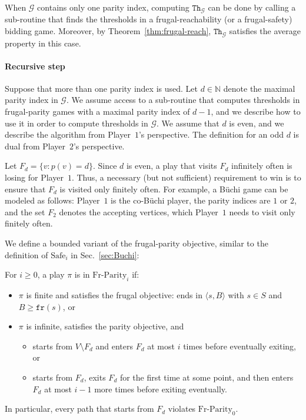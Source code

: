 \documentclass{article}\providecommand{\nequiv}{\not\equiv}\usepackage[a4paper,margin=20mm]{geometry}
\newcommand{\PO}{Player~$1$\xspace}
\newcommand{\PT}{Player~$2$\xspace}
\newcommand{\G}{{\mathcal G}}
\newcommand{\fr}{\texttt{fr}}
\newcommand{\Nat}{\mathbb{N}}
\newcommand{\notFd}{V \setminus F_d}
\newcommand{\thresh}{\texttt{Th}\xspace}
\newcommand{\safe}{\text{Safe}}
\newcommand{\frparity}{\text{Fr-Parity}}
\newcommand{\zug}[1]{\langle #1  \rangle}
\renewcommand{\set}[1]{\{ #1  \}}
\begin{document}
\begin{corollary}
When $\G$ contains only one parity index, computing $\thresh_\G$ can be done by calling a sub-routine that finds the thresholds in a frugal-reachability (or a frugal-safety) bidding game. Moreover, by Theorem~\ref{thm:frugal-reach}, $\thresh_\G$ satisfies the average property in this case. 
\end{corollary}

\paragraph*{Recursive step}
Suppose that more than one parity index is used. Let $d \in \Nat$ denote the maximal parity index in $\G$. 
We assume access to a sub-routine that computes thresholds in frugal-parity games with a maximal parity index of $d-1$, and we describe how to use it in order to  compute thresholds in $\G$. We assume that $d$ is even, and we describe the algorithm from \PO's perspective. 
The definition for an odd $d$ is dual from \PT's perspective. 



Let $F_d = \set{v: p(v) = d}$. Since $d$ is even, a play that visits $F_d$ infinitely often is losing for \PO. Thus, a necessary (but not sufficient) requirement to win is to ensure that $F_d$ is visited only finitely often. For example, a B\"uchi game can be modeled as follows: \PO is the co-B\"uchi player, the parity indices are $1$ or $2$, and the set $F_2$ denotes the accepting vertices, which \PO needs to visit only finitely often. 

We define a bounded variant of the frugal-parity objective, similar to the definition of $\safe_i$ in Sec.~\ref{sec:Buchi}:
\begin{definition}
For $i \geq 0$, a play $\pi$ is in $\frparity_i$ if:
\begin{itemize}
\item $\pi$ is finite and satisfies the frugal objective: ends in $\zug{s, B}$ with $s \in S$ and $B \geq \fr(s)$, or
\item $\pi$ is infinite, satisfies the parity objective, and 
\begin{itemize}
\item starts from $\notFd$ and enters $F_d$ at most $i$ times before eventually exiting, or
\item starts from $F_d$, exits $F_d$ for the first time at some point, and then enters $F_d$ at most $i-1$ more times before exiting eventually. 
\end{itemize}
\end{itemize}
\end{definition}
In particular, every path that starts from $F_d$ violates $\frparity_0$. 
\end{document}
